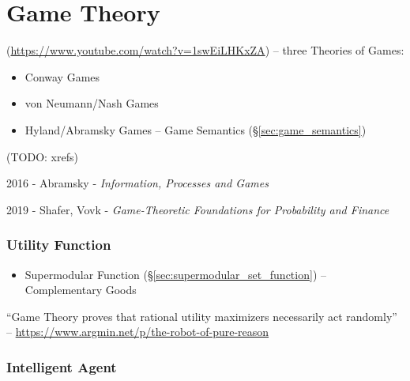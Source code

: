 \part{Game Theory}\label{sec:game_theory}

(\url{https://www.youtube.com/watch?v=1swEiLHKxZA}) -- three Theories of Games:
\begin{itemize}
  \item Conway Games
  \item von Neumann/Nash Games
  \item Hyland/Abramsky Games -- Game Semantics (\S\ref{sec:game_semantics})
\end{itemize}
(TODO: xrefs)

2016 - Abramsky - \emph{Information, Processes and Games}

2019 - Shafer, Vovk
- \emph{Game-Theoretic Foundations for Probability and Finance}



\section{Utility Function}\label{sec:utility_function}


\begin{itemize}
  \item Supermodular Function (\S\ref{sec:supermodular_set_function}) --
    Complementary Goods
\end{itemize}

``Game Theory proves that rational utility maximizers necessarily act randomly''
-- \url{https://www.argmin.net/p/the-robot-of-pure-reason}



\section{Intelligent Agent}\label{sec:intelligent_agent}

